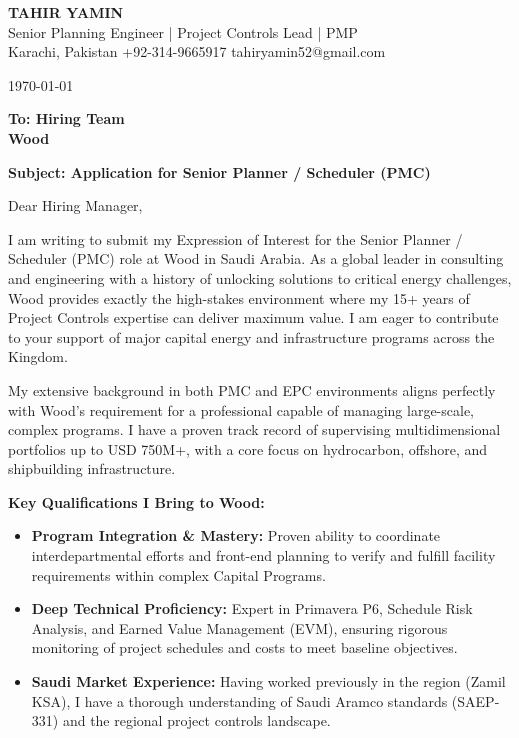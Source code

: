 \documentclass[11pt,a4paper]{article}
\begin{document}
\begin{center}
    {\Huge \textbf{\color{awesome-darknight} TAHIR YAMIN}} \\[0.2cm]
    {\Large \color{awesome-gray} Senior Planning Engineer | Project Controls Lead | PMP} \\[0.3cm]
    
    \small \color{light-gray}
    Karachi, Pakistan \quad \textbullet \quad 
    +92-314-9665917 \quad \textbullet \quad 
    tahiryamin52@gmail.com
\end{center}

\vspace{0.8cm}
\today
\vspace{0.5cm}

\textbf{To: Hiring Team} \\
\textbf{Wood} \\
\vspace{0.5cm}

\textbf{Subject: Application for Senior Planner / Scheduler (PMC)}

\vspace{0.5cm}

Dear Hiring Manager,

I am writing to submit my Expression of Interest for the Senior Planner / Scheduler (PMC) role at Wood in Saudi Arabia. As a global leader in consulting and engineering with a history of unlocking solutions to critical energy challenges, Wood provides exactly the high-stakes environment where my 15+ years of Project Controls expertise can deliver maximum value. I am eager to contribute to your support of major capital energy and infrastructure programs across the Kingdom.

My extensive background in both PMC and EPC environments aligns perfectly with Wood’s requirement for a professional capable of managing large-scale, complex programs. I have a proven track record of supervising multidimensional portfolios up to USD 750M+, with a core focus on hydrocarbon, offshore, and shipbuilding infrastructure.

\textbf{Key Qualifications I Bring to Wood:}
\begin{itemize}
    \item \textbf{Program Integration \& Mastery:} Proven ability to coordinate interdepartmental efforts and front-end planning to verify and fulfill facility requirements within complex Capital Programs.
    \item \textbf{Deep Technical Proficiency:} Expert in Primavera P6, Schedule Risk Analysis, and Earned Value Management (EVM), ensuring rigorous monitoring of project schedules and costs to meet baseline objectives.
    \item \textbf{Saudi Market Experience:} Having worked previously in the region (Zamil KSA), I have a thorough understanding of Saudi Aramco standards (SAEP-331) and the regional project controls landscape.
\end{itemize}
\end{document}
